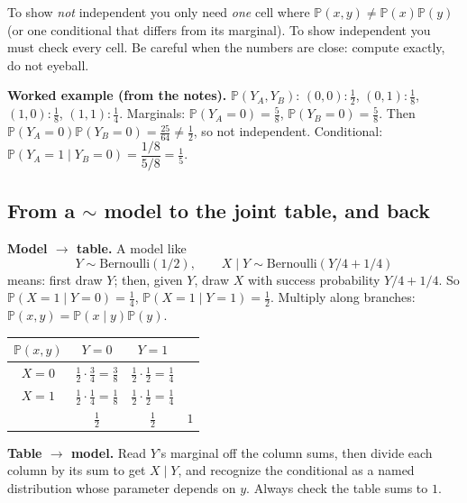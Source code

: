 \documentclass[11pt]{article}
\renewcommand{\P}{\mathbb{P}}
\newcommand{\given}{\mid}
\newcommand{\Bern}{\text{Bernoulli}}
\begin{document}
\begin{tipbox}[title={Exam move: ``are $X$ and $Y$ independent? Justify with a single calculation''}]
To show \emph{not} independent you only need \emph{one} cell where $\P(x,y)\ne\P(x)\P(y)$ (or one conditional that differs from its marginal).
To show independent you must check every cell. Be careful when the numbers are close: compute exactly, do not eyeball.
\end{tipbox}

\textbf{Worked example (from the notes).} $\P(Y_A,Y_B)$: $(0,0)\!:\tfrac12$, $(0,1)\!:\tfrac18$, $(1,0)\!:\tfrac18$, $(1,1)\!:\tfrac14$.
Marginals: $\P(Y_A=0)=\tfrac58$, $\P(Y_B=0)=\tfrac58$. Then $\P(Y_A=0)\P(Y_B=0)=\tfrac{25}{64}\neq\tfrac12$, so not independent.
Conditional: $\P(Y_A=1\given Y_B=0)=\dfrac{1/8}{5/8}=\tfrac15$.

\subsection{From a $\sim$ model to the joint table, and back}
\textbf{Model $\to$ table.} A model like
\[
Y\sim\Bern(1/2),\qquad X\given Y\sim\Bern(Y/4+1/4)
\]
means: first draw $Y$; then, given $Y$, draw $X$ with success probability $Y/4+1/4$. So
$\P(X{=}1\given Y{=}0)=\tfrac14$, $\P(X{=}1\given Y{=}1)=\tfrac12$. Multiply along branches:
$\P(x,y)=\P(x\given y)\P(y)$.
\begin{center}
\begin{tabular}{c|cc|c}
$\P(x,y)$ & $Y=0$ & $Y=1$ &\\\hline
$X=0$ & $\tfrac12\cdot\tfrac34=\tfrac38$ & $\tfrac12\cdot\tfrac12=\tfrac14$ &\\
$X=1$ & $\tfrac12\cdot\tfrac14=\tfrac18$ & $\tfrac12\cdot\tfrac12=\tfrac14$ &\\\hline
 & $\tfrac12$ & $\tfrac12$ & $1$
\end{tabular}
\end{center}
\textbf{Table $\to$ model.} Read $Y$'s marginal off the column sums, then divide each column by its sum to get $X\given Y$, and recognize the
conditional as a named distribution whose parameter depends on $y$. Always check the table sums to $1$.
\end{document}
